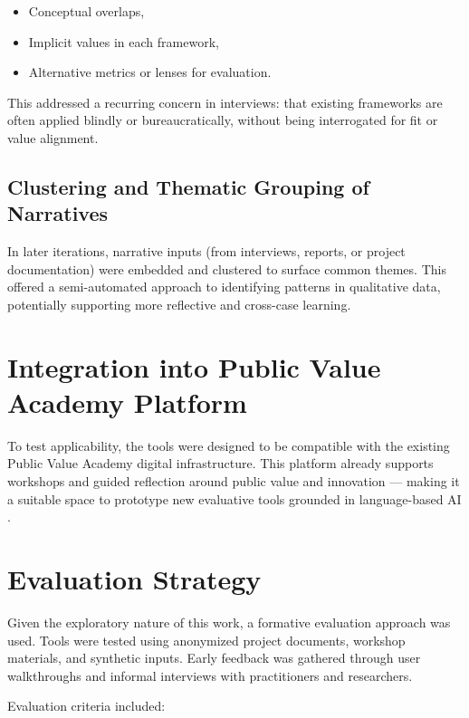\begin{itemize}
    \item Conceptual overlaps,
    \item Implicit values in each framework,
    \item Alternative metrics or lenses for evaluation.
\end{itemize}

This addressed a recurring concern in interviews: that existing frameworks are often applied blindly or bureaucratically, without being interrogated for fit or value alignment.

\subsection{Clustering and Thematic Grouping of Narratives}\label{subsec:clustering-and-thematic-grouping-of-narratives}

In later iterations, narrative inputs (from interviews, reports, or project documentation) were embedded and clustered to surface common themes.
This offered a semi-automated approach to identifying patterns in qualitative data, potentially supporting more reflective and cross-case learning.

\section{Integration into Public Value Academy Platform}\label{sec:integration-into-public-value-academy-platform}

To test applicability, the tools were designed to be compatible with the existing Public Value Academy digital infrastructure.
This platform already supports workshops and guided reflection around public value and innovation — making it a suitable space to prototype new evaluative tools grounded in language-based AI .

\section{Evaluation Strategy}\label{sec:evaluation-strategy}

Given the exploratory nature of this work, a formative evaluation approach was used.
Tools were tested using anonymized project documents, workshop materials, and synthetic inputs.
Early feedback was gathered through user walkthroughs and informal interviews with practitioners and researchers.

Evaluation criteria included:

